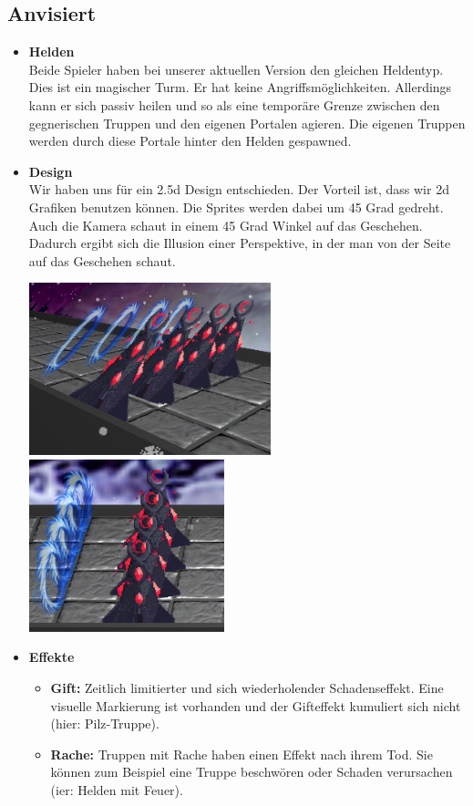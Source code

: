 \subsection{Anvisiert}
\begin{itemize}
    \item \textbf{Helden} \\
        Beide Spieler haben bei unserer aktuellen Version den gleichen Heldentyp. Dies ist ein magischer Turm. Er hat keine Angriffsmöglichkeiten. Allerdings kann er sich passiv heilen und so als eine
        temporäre Grenze zwischen den gegnerischen Truppen und den eigenen Portalen agieren. Die eigenen Truppen werden durch diese Portale hinter den Helden gespawned.
    \item \textbf{Design} \\
        Wir haben uns für ein 2.5d Design entschieden. Der Vorteil ist, dass wir 2d Grafiken benutzen können. Die Sprites werden dabei um 45 Grad gedreht. Auch 
        die Kamera schaut in einem 45 Grad Winkel auf das Geschehen. Dadurch ergibt sich die Illusion einer Perspektive, in der man von der Seite auf das Geschehen schaut. 
        \begin{center}
            \includegraphics*[height=5cm]{resources/25d.png} \includegraphics*[height=5cm]{resources/25dtwo.png}\\
        \end{center}
        
    \item \textbf{Effekte}
    \begin{itemize}
        \item \textbf{Gift:}
        Zeitlich limitierter und sich wiederholender Schadenseffekt.
        Eine visuelle Markierung ist vorhanden und der Gifteffekt kumuliert sich nicht (hier: Pilz-Truppe).
        \item \textbf{Rache:}
            Truppen mit Rache haben einen Effekt nach ihrem Tod. Sie können zum Beispiel eine Truppe beschwören oder Schaden verursachen (ier: Helden mit Feuer).
    \end{itemize}
\end{itemize}

